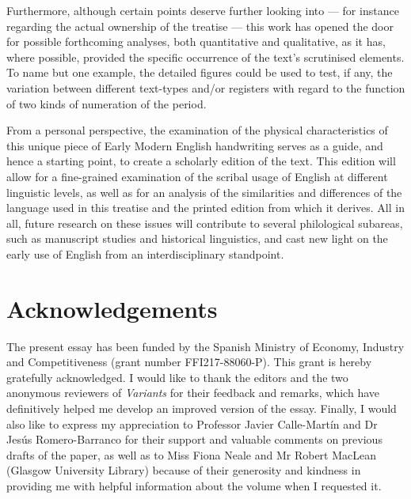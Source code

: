 \documentclass{article}
\begin{document}
Furthermore, although certain points deserve further looking into –– for instance regarding the
actual ownership of the treatise –– this work has opened the
door for possible forthcoming analyses, both quantitative and
qualitative, as it has, where possible, provided the specific occurrence
of the text's scrutinised elements. To name but one example, the
detailed figures could be used to test, if any, the variation between different text-types and/or
registers with regard to the function of two kinds of numeration of the period.

From a personal perspective, the examination of the physical
characteristics of this unique piece of Early Modern English handwriting serves as a guide, and hence a starting point, to create a scholarly edition of the text. This
edition will allow for a fine-grained examination of the
scribal usage of English at different linguistic levels, as well as for
an analysis of the similarities and differences of the
language used in this treatise and the printed edition from which it derives.
All in all, future research on these issues will
contribute to several philological subareas, such as manuscript studies and
historical linguistics, and cast new light on the
early use of English from an interdisciplinary standpoint.


\section*{Acknowledgements}
The present essay has
  been funded by the Spanish Ministry of Economy, Industry and
  Competitiveness (grant number FFI217-88060-P). This grant is hereby
  gratefully acknowledged. I would like to thank the editors and the two
  anonymous reviewers of \emph{Variants} for their feedback and remarks,
  which have definitively helped me develop an improved version of the
  essay. Finally, I would also like to express my appreciation to Professor
  Javier Calle-Martín and Dr Jesús Romero-Barranco for their support and valuable
  comments on previous drafts of the paper, as well as to Miss Fiona
  Neale and Mr Robert MacLean (Glasgow University Library) because of
  their generosity and kindness in providing me with helpful information
  about the volume when I requested it.
  
\begin{flushleft}
    \renewcommand*{\mkbibnamefamily}[1]{\textsc{#1}}
    \renewcommand*{\mkbibnamegiven}[1]{\textsc{#1}} 
\printbibliography
\end{flushleft}
\end{document}
